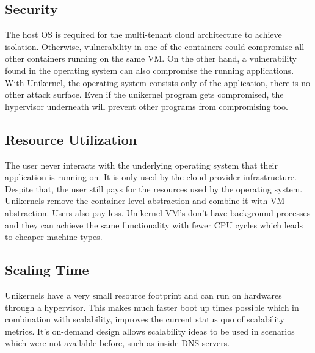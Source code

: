 \subsection{Security}
 The host OS is required for the multi-tenant cloud architecture to achieve isolation. Otherwise, vulnerability in one of the containers could compromise all other containers running on the same VM. On the other hand, a vulnerability found in the operating system can also compromise the running applications. With Unikernel, the operating system consists only of the application, there is no other attack surface. Even if the unikernel program gets compromised, the hypervisor underneath will prevent other programs from compromising too.

\subsection{Resource Utilization}
The user never interacts with the underlying operating system that their application is running on. It is only used by the cloud provider infrastructure. Despite that, the user still pays for the resources used by the operating system. Unikernels remove the container level abstraction and combine it with VM abstraction. Users also pay less. Unikernel VM's don't have background processes and they can achieve the same functionality with fewer CPU cycles which leads to cheaper machine types.

\subsection{Scaling Time}
Unikernels have a very small resource footprint and can run on hardwares through a hypervisor. This makes much faster boot up times possible which in combination with scalability, improves the current status quo of scalability metrics. It's on-demand design allows scalability ideas to be used in scenarios which were not available before, such as inside DNS servers.

